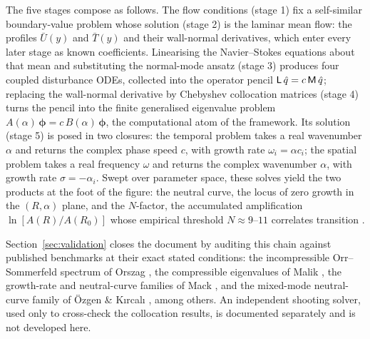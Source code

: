 \documentclass[11pt]{article}
\begin{document}
The five stages compose as follows. The flow conditions (stage 1) fix a self-similar
boundary-value problem whose solution (stage 2) is the laminar mean flow: the profiles $\bar U(y)$
and $\bar T(y)$ and their wall-normal derivatives, which enter every later stage as known
coefficients. Linearising the Navier--Stokes equations about that mean and substituting the
normal-mode ansatz (stage 3) produces four coupled disturbance ODEs, collected into the operator
pencil $\mathsf L\,\hat{q}=c\,\mathsf M\,\hat{q}$; replacing the wall-normal derivative by Chebyshev
collocation matrices (stage 4) turns the pencil into the finite generalised eigenvalue problem
$A(\alpha)\,\boldsymbol\phi=c\,B(\alpha)\,\boldsymbol\phi$, the computational atom of the
framework. Its solution (stage 5) is posed in two closures: the temporal problem takes a real
wavenumber $\alpha$ and returns the complex phase speed $c$, with growth rate $\omega_i=\alpha
c_i$; the spatial problem takes a real frequency $\omega$ and returns the complex wavenumber
$\alpha$, with growth rate $\sigma=-\alpha_i$. Swept over parameter space, these solves yield the
two products at the foot of the figure: the neutral curve, the locus of zero growth in the
$(R,\alpha)$ plane, and the $N$-factor, the accumulated amplification $\ln[A(R)/A(R_0)]$ whose
empirical threshold $N\approx9$--$11$ correlates transition \cite{smith1956,vaningen1956}.

Section~\ref{sec:validation} closes the document by auditing this chain against published
benchmarks at their exact stated conditions: the incompressible Orr--Sommerfeld spectrum of Orszag
\cite{orszag1971}, the compressible eigenvalues of Malik \cite{malik1990}, the growth-rate
and neutral-curve families of Mack \cite{mack1984}, and the mixed-mode neutral-curve family of
\"Ozgen \& K{\i}rcal{\i} \cite{ozgen2008}, among others. An independent shooting solver, used only
to cross-check the collocation results, is documented separately and is not developed here.
\end{document}

